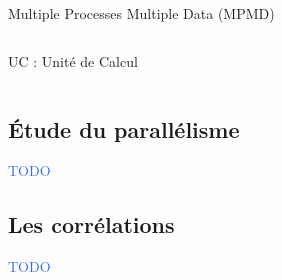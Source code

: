 \documentclass[../main.tex]{subfiles}
\begin{document}
\begin{frame}{Multiple Processes Multiple Data (MPMD)}
  \begin{columns}
    \begin{column}{.5\linewidth}
      {}
      UC : Unité de Calcul
    \end{column}
  \end{columns}
\end{frame}

\subsection{Étude du parallélisme}

\begin{frame}{\subsecname}
  \begin{center}
    \textcolor{RoyalBlue}{TODO}
  \end{center}
\end{frame}

\subsection{Les corrélations}

\begin{frame}{}
  \begin{center}
    \textcolor{RoyalBlue}{TODO}
  \end{center}
\end{frame}
\end{document}
